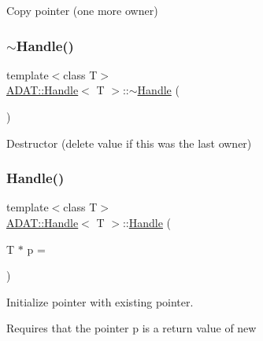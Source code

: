 Copy pointer (one more owner) 

\mbox{\label{classADAT_1_1Handle_a358ca2d3df9674e7ccb416574df96ce5}} 
\subsubsection{\texorpdfstring{$\sim$Handle()}{~Handle()}\hspace{0.1cm}{\footnotesize\ttfamily [1/2]}}
{\footnotesize\ttfamily template$<$class T$>$ \\
\mbox{\hyperlink{classADAT_1_1Handle}{A\+D\+A\+T\+::\+Handle}}$<$ T $>$\+::$\sim$\mbox{\hyperlink{classADAT_1_1Handle}{Handle}} (\begin{DoxyParamCaption}{ }\end{DoxyParamCaption})\hspace{0.3cm}{\ttfamily [inline]}}



Destructor (delete value if this was the last owner) 

\mbox{\label{classADAT_1_1Handle_a510e41b73c3f685f4eb78a91020782c0}} 
\subsubsection{\texorpdfstring{Handle()}{Handle()}\hspace{0.1cm}{\footnotesize\ttfamily [3/4]}}
{\footnotesize\ttfamily template$<$class T$>$ \\
\mbox{\hyperlink{classADAT_1_1Handle}{A\+D\+A\+T\+::\+Handle}}$<$ T $>$\+::\mbox{\hyperlink{classADAT_1_1Handle}{Handle}} (\begin{DoxyParamCaption}\item[{T $\ast$}]{p = {} }\end{DoxyParamCaption})\hspace{0.3cm}{\ttfamily [inline]}}



Initialize pointer with existing pointer. 

Requires that the pointer p is a return value of new \mbox{\label{classADAT_1_1Handle_af9529874ca6ca9db10dbbeeb0a776d84}} 
